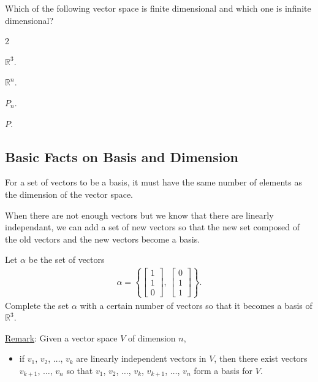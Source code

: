 \documentclass[12pt,a4paper]{article}
\newcounter{example}[section]
\begin{document}
	\begin{example}
	Which of the following vector space is finite dimensional and which one is infinite dimensional?
		\begin{enumerate}
		\end{enumerate}
	\end{example}
	
	\newpage
	
	\subsection{Basic Facts on Basis and Dimension}
	For a set of vectors to be a basis, it must have the same number of elements as the dimension of the vector space. 
	
	\vspace*{12pt}
	
	When there are not enough vectors but we know that there are linearly independant, we can add a set of new vectors so that the new set composed of the old vectors and the new vectors become a basis.
	
	\vspace*{16pt}
	
	\begin{example}
	Let $\alpha$ be the set of vectors
		\begin{align*}
		\alpha = \left\lbrace \begin{bmatrix}
		1 \\ 1 \\ 0
		\end{bmatrix}, \, \begin{bmatrix}
		0 \\ 1 \\ 1
		\end{bmatrix} \right\rbrace .
		\end{align*}
	Complete the set $\alpha$ with a certain number of vectors so that it becomes a basis of $\mathbb{R}^3$.
	\end{example}
	
	\vfill
	
	\noindent\underline{Remark}: Given a vector space $V$ of dimension $n$,
		\begin{itemize}
		\item if $v_1$, $v_2$, $\ldots$, $v_k$ are linearly independent vectors in $V$, then there exist vectors $v_{k+1}$, $\ldots$, $v_n$ so that $v_1$, $v_2$, $\ldots$, $v_k$, $v_{k+1}$, $\ldots$, $v_n$ form a basis for $V$.
		\end{itemize}
	
\end{document}
